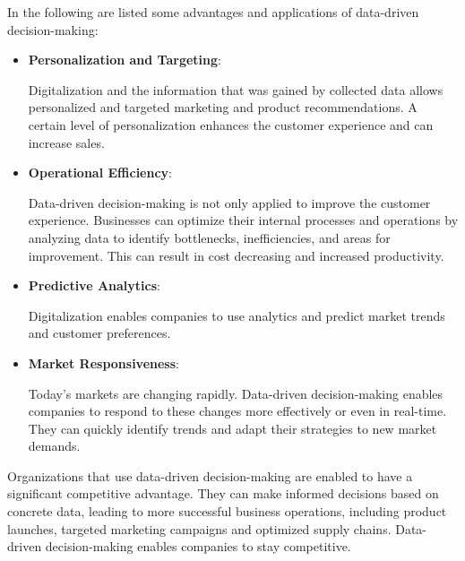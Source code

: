\documentclass[a4]{scrartcl}
\begin{document}
	In the following are listed some advantages and applications of data-driven decision-making:
	
	\begin{itemize}
				
		
		\item \textbf{Personalization and Targeting}: 
		
		Digitalization and the information that was gained by collected data allows personalized and targeted marketing and product recommendations. A certain level of personalization enhances the customer experience and can increase sales.~\cite{DDDM, socialmedia}
		
		\item \textbf{Operational Efficiency}: 
		
		Data-driven decision-making is not only applied to improve the customer experience. Businesses can optimize their internal processes and operations by analyzing data to identify bottlenecks, inefficiencies, and areas for improvement. This can result in cost decreasing and increased productivity.~\cite{DDDM}
		
		\item \textbf{Predictive Analytics}: 
		
		Digitalization enables companies to use analytics and predict market trends and customer preferences.~\cite{DDDM, masterthesis, leadingdigital}

		
		\item \textbf{Market Responsiveness}: 
		
		Today's markets are changing rapidly. Data-driven decision-making enables companies to respond to these changes more effectively or even in real-time. They can quickly identify trends and adapt their strategies to new market demands.~\cite{DDDM, digitalmatrix, leadingdigital}
		
		
	\end{itemize}
	
	
	Organizations that use data-driven decision-making are enabled to have a significant competitive advantage. They can make informed decisions based on concrete data, leading to more successful business operations, including product launches, targeted marketing campaigns and optimized supply chains.
	Data-driven decision-making enables companies to stay competitive.~\cite{DDDM, digitalmatrix, leadingdigital}
	



\end{document}
